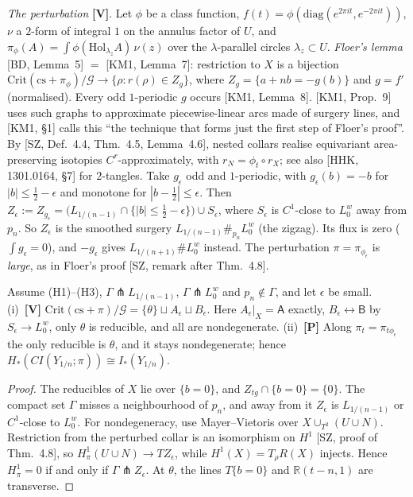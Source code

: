 \smallskip\noindent\emph{The perturbation} \textbf{[V]}.  Let $\phi$ be a class function,
$f(t)=\phi(\mathrm{diag}(e^{2\pi it},e^{-2\pi it}))$, $\nu$ a $2$-form of integral $1$ on the annulus factor of $U$, and
$\pi_\phi(A)=\int\phi(\mathrm{Hol}_{\lambda_z}A)\,\nu(z)$ over the $\lambda$-parallel circles $\lambda_z\subset U$.
\emph{Floer's lemma} [BD, Lemma~5] $=$ [KM1, Lemma~7]: restriction to $X$ is a bijection
$\mathrm{Crit}(\mathrm{cs}+\pi_\phi)/\mathcal G\to\{\rho:r(\rho)\in Z_g\}$, where $Z_g=\{a+nb=-g(b)\}$ and $g=f'$ (normalised).
Every odd $1$-periodic $g$ occurs [KM1, Lemma~8].  [KM1, Prop.~9] uses such graphs to approximate piecewise-linear arcs
made of surgery lines, and [KM1, \S1] calls this ``the technique that forms just the first step of Floer's proof''.
By [SZ, Def.~4.4, Thm.~4.5, Lemma~4.6], nested collars realise equivariant area-preserving isotopies $C^r$-approximately,
with $r_N=\phi_t\circ r_X$; see also [HHK, 1301.0164, \S7] for $2$-tangles.  Take $g_\epsilon$ odd and $1$-periodic, with
$g_\epsilon(b)=-b$ for $|b|\le\frac12-\epsilon$ and monotone for $|b-\frac12|\le\epsilon$.  Then
$Z_\epsilon:=Z_{g_\epsilon}=\big(L_{1/(n-1)}\cap\{|b|\le\frac12-\epsilon\}\big)\cup S_\epsilon$, where $S_\epsilon$ is $C^1$-close to
$L^w_0$ away from $p_n$.  So $Z_\epsilon$ is the smoothed surgery $L_{1/(n-1)}\#_{p_n}L^w_0$ (the zigzag).  Its flux is
zero ($\int g_\epsilon=0$), and $-g_\epsilon$ gives $L_{1/(n+1)}\#L^w_0$ instead.  The perturbation
$\pi=\pi_{\phi_\epsilon}$ is \emph{large}, as in Floer's proof [SZ, remark after Thm.~4.8].

\begin{lemma}\label{fp:lem:crit}
Assume (H1)--(H3), $\Gamma\pitchfork L_{1/(n-1)}$, $\Gamma\pitchfork L^w_0$ and $p_n\notin\Gamma$, and let $\epsilon$ be small.
(i)~\textbf{[V]} $\mathrm{Crit}(\mathrm{cs}+\pi)/\mathcal G=\{\theta\}\sqcup A_\epsilon\sqcup B_\epsilon$.  Here $A_\epsilon|_X=\mathsf A$
exactly, $B_\epsilon\leftrightarrow\mathsf B$ by $S_\epsilon\to L^w_0$, only $\theta$ is reducible, and all are nondegenerate.
(ii)~\textbf{[P]} Along $\pi_t=\pi_{t\phi_\epsilon}$ the only reducible is $\theta$, and it stays nondegenerate; hence
$H_*(\mathit{CI}(Y_{1/n};\pi))\cong I_*(Y_{1/n})$.
\end{lemma}
\begin{proof}
The reducibles of $X$ lie over $\{b=0\}$, and $Z_{tg}\cap\{b=0\}=\{0\}$.  The compact set $\Gamma$ misses a neighbourhood
of $p_n$, and away from it $Z_\epsilon$ is $L_{1/(n-1)}$ or $C^1$-close to $L^w_0$.  For nondegeneracy, use
Mayer--Vietoris over $X\cup_{T^2}(U\cup N)$.  Restriction from the perturbed collar is an isomorphism on $H^1$
[SZ, proof of Thm.~4.8], so $H^1_\pi(U\cup N)\to TZ_\epsilon$, while $H^1(X)=T_\rho R(X)$ injects.  Hence $H^1_\pi=0$ if and only
if $\Gamma\pitchfork Z_\epsilon$.  At $\theta$, the lines $T\{b=0\}$ and $\mathbb R(t-n,1)$ are transverse.
\end{proof}


